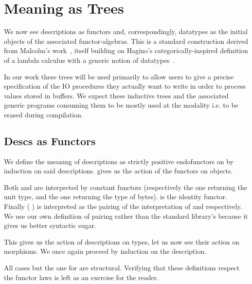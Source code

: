 \section{Meaning as Trees}\label{sec:trees}

We now see descriptions as functors and, correspondingly,
datatypes as the initial objects of the associated functor-algebras.
%
This is a standard construction derived from Malcolm's
work~\citep{DBLP:journals/scp/Malcolm90},
itself building on Hagino's categorically-inspired
definition of a lambda calculus
with a generic notion of datatypes~\citep{DBLP:conf/ctcs/Hagino87}.

In our work these trees will be used primarily to allow users to
give a precise specification of the IO procedures they actually want
to write in order to process values stored in buffers.
%
We expect these inductive trees and the associated generic programs
consuming them to be mostly used at the 
modality i.e. to be erased during compilation.

\subsection{Descs as Functors}

We define the meaning of descriptions as strictly positive
endofunctors on  by induction on said descriptions.
%
 gives us the action of the functors on objects.


Both  and  are interpreted by constant
functors (respectively the one returning the unit type, and the one returning
the type of bytes).
%
 is the identity functor.
%
Finally (  )
is interpreted as the pairing of the interpretation of
 and  respectively.
We use our own definition of pairing rather than the
standard library's because it gives us better syntactic sugar.


This gives us the action of descriptions on types, let us now
see their action on morphisms.
%
We once again proceed by induction on the description.

\label{def:fmap}

All cases but the one for  are structural.
%
Verifying that these definitions respect the functor laws is left as
an exercise for the reader.

